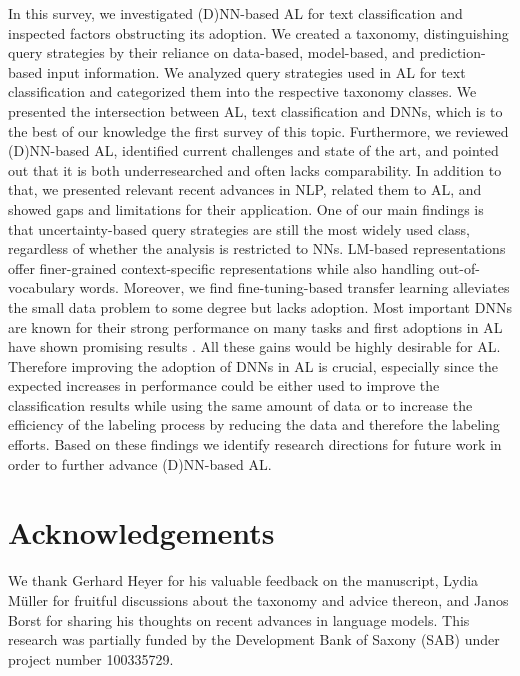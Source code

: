 In this survey, we investigated (D)NN-based AL for text classification and inspected factors obstructing its adoption.
We created a taxonomy, distinguishing query strategies by their reliance on data-based, model-based, and prediction-based input information.
We analyzed query strategies used in AL for text classification and categorized them into the respective taxonomy classes.
We presented the intersection between AL, text classification and DNNs, which is to the best of our knowledge the first survey of this topic.
Furthermore, we reviewed (D)NN-based AL, identified current challenges and state of the art, and pointed out that it is both underresearched and often lacks comparability.
In addition to that, we presented relevant recent advances in NLP, related them to AL, and showed gaps and limitations for their application.
One of our main findings is that uncertainty-based query strategies are still the most widely used class, regardless of whether the analysis is restricted to NNs.
LM-based representations offer finer-grained context-specific representations while also handling out-of-vocabulary words. 
Moreover, we find fine-tuning-based transfer learning alleviates the small data problem to some degree but lacks adoption.
Most important DNNs are known for their strong performance on many tasks and first adoptions in AL have shown promising results .
All these gains would be highly desirable for AL.
Therefore improving the adoption of DNNs in AL is crucial, especially since the expected increases in performance could be either used to improve the classification results while using the same amount of data or to increase the efficiency of the labeling process by reducing the data and therefore the labeling efforts.
Based on these findings we identify research directions for future work in order to further advance (D)NN-based AL.
\section*{Acknowledgements}
We thank Gerhard Heyer for his valuable feedback on the manuscript, Lydia Müller for fruitful discussions about the taxonomy and advice thereon, and Janos Borst for sharing his thoughts on recent advances in language models.
This research was partially funded by the Development Bank of Saxony
(SAB) under project number 100335729.
\printbibliography
\appendix



